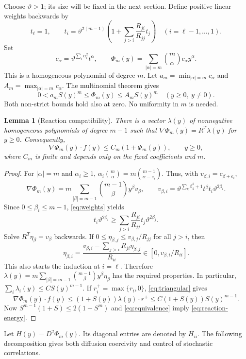 \documentclass[11pt]{amsart}
\newtheorem{lemma}[theorem]{Lemma}
\theoremstyle{definition}
\numberwithin{equation}{section}
\begin{document}
Choose $\vartheta>1$; its size will be fixed in the next section.
Define positive linear weights backwards by
\begin{equation}\label{eq:weights}
t_\ell=1,\qquad
t_i=\vartheta^{2(m-1)}
 \left(1+\sum_{j>i}\frac{R_{ji}}{R_{jj}}t_j\right)
 \quad(i=\ell-1,\ldots,1).
\end{equation}
Set
\begin{equation}\label{eq:polynomial}
c_\alpha=\vartheta^{\sum_i\alpha_i^2}t^\alpha,
\qquad
\Phi_m(y)=\sum_{|\alpha|=m}\binom m\alpha c_\alpha y^\alpha.
\end{equation}
This is a homogeneous polynomial of degree $m$. Let
$a_m=\min_{|\alpha|=m}c_\alpha$ and
$A_m=\max_{|\alpha|=m}c_\alpha$. The multinomial theorem gives
\begin{equation}\label{eq:equivalence}
0<a_m S(y)^m\leq\Phi_m(y)\leq A_m S(y)^m\quad(y\geq0,\ y\ne0).
\end{equation}
Both non-strict bounds hold also at zero. No uniformity in $m$ is needed.

\begin{lemma}[Reaction compatibility]\label{lem:reaction}
There is a vector $\lambda(y)$ of nonnegative homogeneous polynomials
of degree $m-1$ such that
$\nabla\Phi_m(y)=R^T\lambda(y)$ for $y\geq0$. Consequently,
\begin{equation}\label{eq:reaction-energy}
\nabla\Phi_m(y)\cdot f(y)\leq C_m(1+\Phi_m(y)),\qquad y\geq0,
\end{equation}
where $C_m$ is finite and depends only on the fixed coefficients and $m$.
\end{lemma}
\begin{proof}
For $|\alpha|=m$ and $\alpha_i\geq1$,
$\alpha_i\binom m\alpha=m\binom{m-1}{\alpha-e_i}$.
Thus, with $v_{\beta,i}=c_{\beta+e_i}$,
\begin{equation}\label{eq:gradient}
\nabla\Phi_m(y)=m\sum_{|\beta|=m-1}\binom{m-1}\beta y^\beta v_\beta,
\qquad
v_{\beta,i}=\vartheta^{\sum_k\beta_k^2+1}t^\beta
 t_i\vartheta^{2\beta_i}.
\end{equation}
Since $0\leq\beta_i\leq m-1$, \eqref{eq:weights} yields
\[
t_i\vartheta^{2\beta_i}
 \geq\sum_{j>i}\frac{R_{ji}}{R_{jj}}t_j\vartheta^{2\beta_j}.
\]
Solve $R^T\eta_\beta=v_\beta$ backwards. If
$0\leq\eta_{\beta,j}\leq v_{\beta,j}/R_{jj}$ for all $j>i$, then
\[
\eta_{\beta,i}
 =\frac{v_{\beta,i}-\sum_{j>i}R_{ji}\eta_{\beta,j}}{R_{ii}}
 \in[0,v_{\beta,i}/R_{ii}].
\]
This also starts the induction at $i=\ell$. Therefore
$\lambda(y)=m\sum_{|\beta|=m-1}\binom{m-1}\beta
y^\beta\eta_\beta$ has the required properties. In particular,
$\sum_i\lambda_i(y)\leq C S(y)^{m-1}$.
If $r_i^+=\max\{r_i,0\}$, \eqref{eq:triangular} gives
\[
\nabla\Phi_m(y)\cdot f(y)
 \leq(1+S(y))\lambda(y)\cdot r^+
 \leq C(1+S(y))S(y)^{m-1}.
\]
Now $S^{m-1}(1+S)\leq2(1+S^m)$ and
\eqref{eq:equivalence} imply \eqref{eq:reaction-energy}.
\end{proof}
Let $H(y)=D^2\Phi_m(y)$. Its diagonal entries are denoted by $H_{ii}$.
The following decomposition gives both diffusion coercivity and control
of stochastic correlations.
\end{document}
